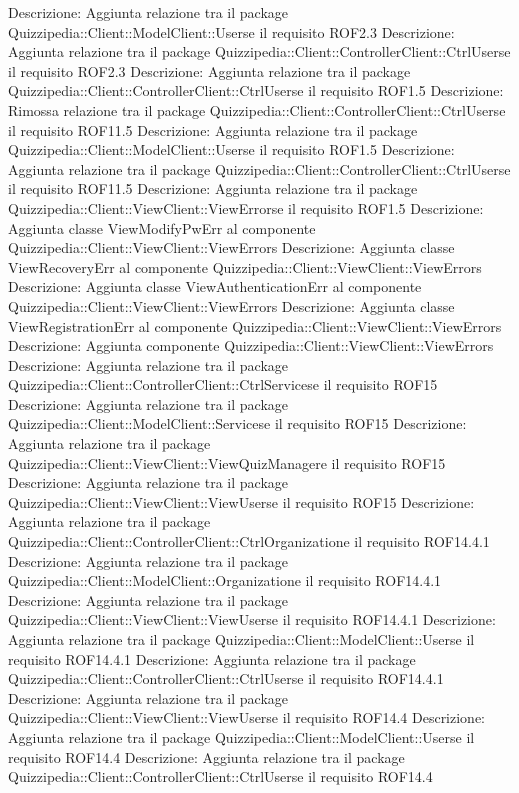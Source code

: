 Descrizione: Aggiunta relazione tra il package Quizzipedia::Client::ModelClient::Userse il requisito ROF2.3 
Descrizione: Aggiunta relazione tra il package Quizzipedia::Client::ControllerClient::CtrlUserse il requisito ROF2.3 
Descrizione: Aggiunta relazione tra il package Quizzipedia::Client::ControllerClient::CtrlUserse il requisito ROF1.5 
Descrizione: Rimossa relazione tra il package Quizzipedia::Client::ControllerClient::CtrlUserse il requisito ROF11.5 
Descrizione: Aggiunta relazione tra il package Quizzipedia::Client::ModelClient::Userse il requisito ROF1.5 
Descrizione: Aggiunta relazione tra il package Quizzipedia::Client::ControllerClient::CtrlUserse il requisito ROF11.5 
Descrizione: Aggiunta relazione tra il package Quizzipedia::Client::ViewClient::ViewErrorse il requisito ROF1.5 
Descrizione: Aggiunta classe ViewModifyPwErr al componente Quizzipedia::Client::ViewClient::ViewErrors 
Descrizione: Aggiunta classe ViewRecoveryErr al componente Quizzipedia::Client::ViewClient::ViewErrors 
Descrizione: Aggiunta classe ViewAuthenticationErr al componente Quizzipedia::Client::ViewClient::ViewErrors 
Descrizione: Aggiunta classe ViewRegistrationErr al componente Quizzipedia::Client::ViewClient::ViewErrors 
Descrizione: Aggiunta componente Quizzipedia::Client::ViewClient::ViewErrors 
Descrizione: Aggiunta relazione tra il package Quizzipedia::Client::ControllerClient::CtrlServicese il requisito ROF15 
Descrizione: Aggiunta relazione tra il package Quizzipedia::Client::ModelClient::Servicese il requisito ROF15 
Descrizione: Aggiunta relazione tra il package Quizzipedia::Client::ViewClient::ViewQuizManagere il requisito ROF15 
Descrizione: Aggiunta relazione tra il package Quizzipedia::Client::ViewClient::ViewUserse il requisito ROF15 
Descrizione: Aggiunta relazione tra il package Quizzipedia::Client::ControllerClient::CtrlOrganizatione il requisito ROF14.4.1 
Descrizione: Aggiunta relazione tra il package Quizzipedia::Client::ModelClient::Organizatione il requisito ROF14.4.1 
Descrizione: Aggiunta relazione tra il package Quizzipedia::Client::ViewClient::ViewUserse il requisito ROF14.4.1 
Descrizione: Aggiunta relazione tra il package Quizzipedia::Client::ModelClient::Userse il requisito ROF14.4.1 
Descrizione: Aggiunta relazione tra il package Quizzipedia::Client::ControllerClient::CtrlUserse il requisito ROF14.4.1 
Descrizione: Aggiunta relazione tra il package Quizzipedia::Client::ViewClient::ViewUserse il requisito ROF14.4 
Descrizione: Aggiunta relazione tra il package Quizzipedia::Client::ModelClient::Userse il requisito ROF14.4 
Descrizione: Aggiunta relazione tra il package Quizzipedia::Client::ControllerClient::CtrlUserse il requisito ROF14.4 

